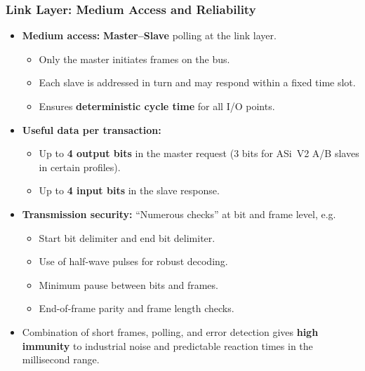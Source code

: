 \begin{frame}
	\frametitle{Link Layer: Medium Access and Reliability}
	\begin{itemize}
		\item \textbf{Medium access:} \textbf{Master–Slave} polling at the link layer.
		\begin{itemize}
			\item Only the master initiates frames on the bus.
			\item Each slave is addressed in turn and may respond within a fixed time slot.
			\item Ensures \textbf{deterministic cycle time} for all I/O points.
		\end{itemize}
		\item \textbf{Useful data per transaction:}
		\begin{itemize}
			\item Up to \textbf{4 output bits} in the master request
				(3 bits for ASi~V2 A/B slaves in certain profiles).
			\item Up to \textbf{4 input bits} in the slave response.
		\end{itemize}
		\item \textbf{Transmission security:} “Numerous checks” at bit and frame level, e.g.
		\begin{itemize}
			\item Start bit delimiter and end bit delimiter.
			\item Use of half-wave pulses for robust decoding.
			\item Minimum pause between bits and frames.
			\item End-of-frame parity and frame length checks.
		\end{itemize}
		\item Combination of short frames, polling, and error detection gives \textbf{high immunity}
			to industrial noise and predictable reaction times in the millisecond range.
	\end{itemize}
\end{frame}

